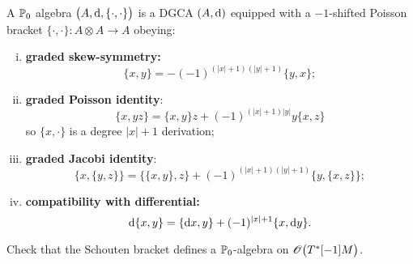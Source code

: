 \begin{definition}
  A $\mathbb{P}_0$ algebra $\bigl( A, \mathrm{d}, \{ \cdot, \cdot \} \bigr)$ is a DGCA $(A, \mathrm{d})$ equipped with a $-1$-shifted Poisson bracket $\{ \cdot, \cdot \}: A \otimes A \rightarrow A$ obeying:
  \begin{enumerate}[i)]
    \item \textbf{graded skew-symmetry:}
      \begin{equation*}
        \{x, y\} = - (-1)^{(|x|+1)(|y|+1)} \{y, x\};
      \end{equation*}
    \item \textbf{graded Poisson identity}:
      \begin{equation*}
        \{x, yz \} = \{x, y\} z + (-1)^{(|x|+1)|y|} y \{x, z\}
      \end{equation*}
      so $\{x, \cdot \}$ is a degree $|x|+1$ derivation;
    \item \textbf{graded Jacobi identity}:
      \begin{equation*}
        \{x, \{y, z\} \} = \{ \{x, y\}, z \} + (-1)^{(|x|+1)(|y|+1)} \{y, \{x, z\} \};
      \end{equation*}
    \item \textbf{compatibility with differential:}
      \begin{equation*}
        \mathrm{d} \{x, y\} = \{ \mathrm{d} x, y \} + (-1)^{|x|+1} \{x, \mathrm{d} y \}.
      \end{equation*}
  \end{enumerate}
\end{definition}

\begin{exercise}
  Check that the Schouten bracket defines a $\mathbb{P}_0$-algebra on $\mathscr{O}\bigl(T^*[-1] M \bigr)$.
\end{exercise}
